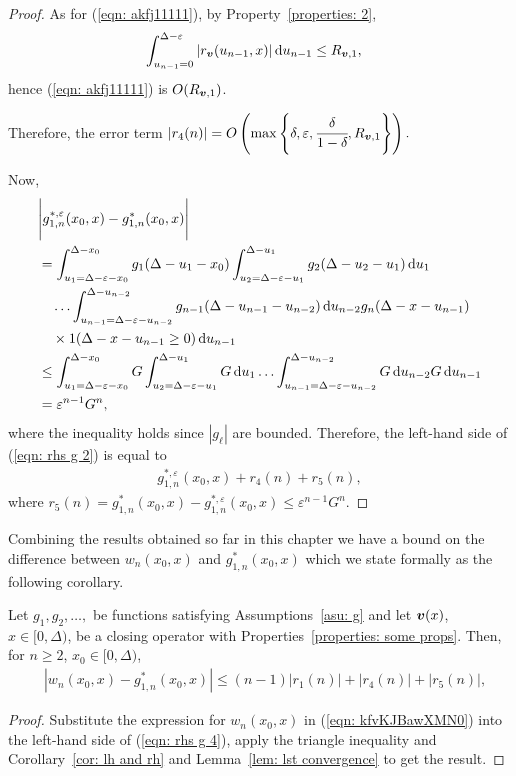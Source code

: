 \begin{proof}
	As for (\ref{eqn: akfj11111}), by Property~\ref{properties: 2}, 
	\begin{align*}
		&\int_{u_{n-1}=0}^{\Delta-\varepsilon}| r_{\boldsymbol v}(u_{n-1},x)|\, \mathrm{d} u_{n-1} 
		\leq R_{{\boldsymbol v},1},
	\end{align*}
	hence (\ref{eqn: akfj11111}) is \(O(R_{{\boldsymbol v},1})\).

	Therefore, the error term \(|r_4(n)| = O\left(\max\left\{\delta,\varepsilon,\cfrac{\delta}{1-\delta},R_{{\boldsymbol v},1}\right\}\right).\)
	
	Now, 
	\begin{align*}
		&\Bigg|g_{1,n}^{*,\varepsilon}(x_0,x) - g_{1,n}^{*}(x_0,x)
		\Bigg|\nonumber
		\\&= \int_{u_1=\Delta-\varepsilon-x_0}^{\Delta-x_0}g_1(\Delta - u_1 - x_0)
		\int_{u_2=\Delta-\varepsilon-u_1}^{\Delta-u_1}g_2(\Delta - u_2 - u_1)\, \mathrm{d} u_1  \nonumber 
		\\&\quad\hdots 
            	\int_{u_{n-1}=\Delta-\varepsilon-u_{n-2}}^{\Delta-u_{n-2}} g_{n-1}(\Delta - u_{n-1} - u_{n-2}) \, \mathrm{d} u_{n-2}
            	g_{n}(\Delta - x-u_{n-1})\nonumber 
		\\&\quad\times 1(\Delta - x-u_{n-1}\geq 0)\, \mathrm{d} u_{n-1}\nonumber
		\\&\leq \int_{u_1=\Delta-\varepsilon-x_0}^{\Delta-x_0}G 
		\int_{u_2=\Delta-\varepsilon-u_1}^{\Delta-u_1}G \, \mathrm{d} u_1  \hdots 
            	\int_{u_{n-1}=\Delta-\varepsilon-u_{n-2}}^{\Delta-u_{n-2}} G \, \mathrm{d} u_{n-2}\nonumber
            	G\, \mathrm{d} u_{n-1} 
		\\& = \varepsilon^{n-1}G ^n,
	\end{align*}
	where the inequality holds since \(|g_\ell|\) are bounded.
	Therefore, the left-hand side of (\ref{eqn: rhs g 2}) is equal to 
	\begin{align*}
		g^{*,\varepsilon}_{1,n}(x_0,x) + r_4(n) + r_5(n),
	\end{align*}
	where \(r_5(n) = g_{1,n}^{*}(x_0,x) - g_{1,n}^{*,\varepsilon}(x_0,x)\leq \varepsilon^{n-1}G ^n\).
\end{proof}

Combining the results obtained so far in this chapter we have a bound on the difference between \(w_n(x_0,x)\) and \(g_{1,n}^*(x_0,x)\) which we state formally as the following corollary.
\begin{cor}\label{cor: a cor}
	Let \(g_1,g_2,\dots,\) be functions satisfying Assumptions~\ref{asu: g} and let \({\boldsymbol v}(x)\), \(x\in[0,\Delta)\), be a closing operator with Properties~\ref{properties: some props}. Then, for \(n\geq 2\), \(x_0\in[0,\Delta)\), 
	\begin{align}
		&\left|w_n(x_0,x)- g_{1,n}^{*}(x_0,x) \right|
		\leq (n-1)|r_1(n)| + |r_4(n)| + |r_5(n)|, \label{eqn: rhs g 4}
	\end{align}
\end{cor}
\begin{proof}
	Substitute the expression for \(w_n(x_0,x)\) in (\ref{eqn: kfvKJBawXMN0}) into the left-hand side of (\ref{eqn: rhs g 4}), apply the triangle inequality and Corollary~\ref{cor: lh and rh} and Lemma~\ref{lem: lst convergence} to get the result.  
\end{proof}

